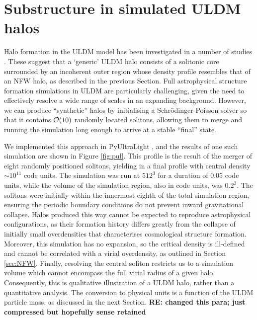 \documentclass[a4paper,11pt]{article}
\newcommand{\re}[1]{{{\bf \color{green} RE: #1}}}
\begin{document}
\section{Substructure in simulated ULDM halos}\label{sec:sim_comparison}

Halo formation in the ULDM model has been investigated in a number of studies \cite{Schwabe:2016rze, Mocz:2017wlg, Lin:2018whl}. These suggest that a `generic' ULDM halo consists of a solitonic core surrounded by an incoherent outer region whose density profile resembles that of an NFW halo, as described in the previous Section. Full astrophysical structure formation simulations in ULDM are particularly challenging, given the need to effectively resolve a wide range of scales in an expanding background. However, we can produce ``synthetic'' halos by initialising a Schr{\"o}dinger-Poisson solver so that it contains ${\cal{O}}(10)$ randomly located solitons, allowing them to merge and running the simulation long enough to arrive at a stable ``final'' state. 

We implemented this approach in {\sc PyUltraLight} \cite{Edwards:2018ccc}, and the results of one such simulation are shown in Figure \ref{fig:pul}. This profile is the result of the merger of eight randomly positioned solitons, yielding in a final profile with central density $\sim 10^{11}$ code units. The simulation was run at $512^3$ for a duration of 0.05 code units, while the volume of the simulation region, also in code units, was $0.2^3$.  The solitons were initially within the innermost eighth of the total simulation region, ensuring the periodic boundary conditions do not  prevent inward gravitational collapse. Halos produced this way cannot be expected to reproduce astrophysical configurations, as their formation history differs greatly from the collapse of initially small overdensities that characterises cosmological structure formation. Moreover,  this simulation has no expansion, so the critical density is ill-defined and  cannot be correlated with a virial overdensity, as outlined in Section \ref{sec:NFW}. Finally, resolving the central soliton restricts us to a simulation volume which cannot encompass the full virial radius of a given halo. Consequently, this is qualitative illustration of a ULDM halo, rather than a quantitative analysis. The conversion to physical units is a function of the ULDM particle mass, as discussed in the next Section. \re{changed this para; just compressed but hopefully sense retained}


\end{document}
